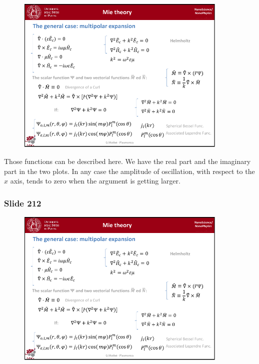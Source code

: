 \documentclass[../main/main.tex]{subfiles}
\begin{document}
\begin{figure}[h!]
\centering
\includegraphics[page=4,width=0.9\textwidth]{../lessons/pdf_file/13_lesson.pdf}
\end{figure}

Those functions can be described here. We have the real part and the imaginary part in the two plots. In any case the amplitude of oscillation, with respect to the \( x \) axis, tends to zero when the argument is getting larger.

\newpage

\subsubsection{Slide 212}

\begin{figure}[h!]
\centering
\includegraphics[page=5,width=0.9\textwidth]{../lessons/pdf_file/13_lesson.pdf}
\end{figure}
\end{document}
